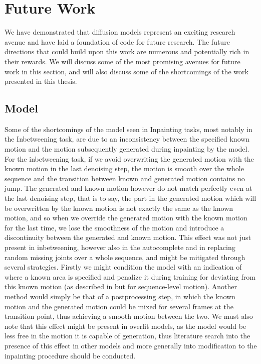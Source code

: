 \section{Future Work}
\label{sec:diffusion_future_work}

We have demonstrated that diffusion models represent an exciting research avenue and have laid a foundation of code for future research. The future directions that could build upon this work are numerous and potentially rich in their rewards. We will discuss some of the most promising avenues for future work in this section, and will also discuss some of the shortcomings of the work presented in this thesis.

\subsection{Model}
Some of the shortcomings of the model seen in Inpainting tasks, most notably in the Inbetweening task, are due to an inconsistency between the specified known motion and the motion subsequently generated during inpainting by the model. For the inbetweening task, if we avoid overwriting the generated motion with the known motion in the last denoising step, the motion is smooth over the whole sequence and the transition between known and generated motion contains no jump. The generated and known motion however do not match perfectly even at the last denoising step, that is to say, the part in the generated motion which will be overwritten by the known motion is not exactly the same as the known motion, and so when we override the generated motion with the known motion for the last time, we lose the smoothness of the motion and introduce a discontinuity between the generated and known motion. This effect was not just present in inbetweening, however also in the autocomplete and in replacing random missing joints over a whole sequence, and might be mitigated through several strategies. Firstly we might condition the model with an indication of where a known area is specified and penalize it during training for deviating from this known motion (as described in  but for sequence-level motion). Another method would simply be that of a postprocessing step, in which the known motion and the generated motion could be mixed for several frames at the transition point, thus achieving a smooth motion between the two. We must also note that this effect might be present in overfit models, as the model would be less free in the motion it is capable of generation, thus literature search into the presence of this effect in other models and more generally into modification to the inpainting procedure should be conducted.

